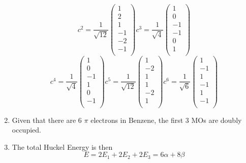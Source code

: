 \begin{enumerate}
\begin{equation}
    c^{2} = \frac{1}{\sqrt{12}}
        \begin{pmatrix} 1 \\ 2 \\ 1 \\ -1 \\ -2 \\ -1 \\ \end{pmatrix}
    c^{3} = \frac{1}{\sqrt{4}}
        \begin{pmatrix} 1 \\ 0 \\ -1 \\- 1 \\ 0 \\ 1 \\ \end{pmatrix}
        \end{equation}
        \begin{equation}
    c^{4} = \frac{1}{\sqrt{4}}
        \begin{pmatrix} 1 \\ 0 \\ -1 \\ 1 \\ 0 \\ -1 \\ \end{pmatrix}
    c^{5} =     \frac{1}{\sqrt{12}}
        \begin{pmatrix} 1 \\ -2 \\ 1 \\ 1 \\ -2 \\ 1 \\ \end{pmatrix}
    c^{6} = \frac{1}{\sqrt{6}}
        \begin{pmatrix} 1 \\ -1 \\ 1 \\ -1 \\ 1 \\ -1 \\ \end{pmatrix}
    \end{equation}
    \item Given that there are 6 $\pi$ electrons in Benzene, the first 3 MOs are doubly occupied.
    \item The total Huckel Energy is then
    \begin{equation}
        E = 2E_{1} + 2E_{2} + 2E_{3} = 6\alpha + 8 \beta
    \end{equation}
\end{enumerate}







